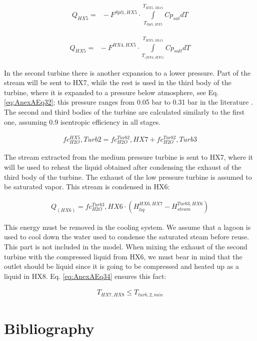 \begin{refsection}[referencesCh2]
\begin{align}
	{{{Q}}_{ {{{HX5}}} }}= \;\; - F^{{Spl1},{{HX5}}}\cdot\int\limits_{{{{T}}_{Spl1,{{HX5}}}}}^{{{{T}}_{{{HX5}},Mix1}}} {C{p_{sat}}dT} \label{eq:AnexAEq30}
\end{align}

\begin{align}
	{{{Q}}_{{{{HX5}}} }} = \;\; - F^{HX4,{{HX5}}}\cdot\int\limits_{{{{T}}_{(HX4,{{HX5)}}}}}^{{{{T}}_{{{HX5}},Mix1}}} {C{p_{salt}}dT} \label{eq:AnexAEq31}
\end{align}

In the second turbine there is another expansion to a lower pressure. Part of the stream will be sent to HX7, while the rest is used in the third body of the turbine,  where it is expanded to a pressure below  atmosphere, see Eq. \ref{eq:AnexAEq32}; this pressure ranges from 0.05 bar to 0.31 bar in the literature \citep{vidal2015optimal}. The second and third bodies of the turbine are calculated similarly to the first one, assuming 0.9 isentropic efficiency in all stages. 

\begin{align}
	{{f}}{{{c}}_{ {H2O} }^{{HX5}},{{Turb2}}} = {{ f}}{{{c}}_{{H2O}}^{{Turb2}},{{HX7}}} + {{f}}{{{c}}_{ {H2O} }^{{Turb2}},{{Turb3}}} \label{eq:AnexAEq32}
\end{align}

The stream extracted from the medium pressure turbine is sent to HX7, where it will be used to reheat the liquid obtained after condensing the exhaust of the third body of the turbine. The exhaust of the low pressure turbine is assumed to be saturated vapor. This stream is condensed in HX6:

\begin{align}
	{{{Q}}_{\left( {{{HX6}}} \right)}} = {{ f}}{{{c}}_{{H2O}}^{{Turb3}},{{HX6}}}\cdot\left( {{{{H}}_{liq}^{HX6,HX7}}{{ - }}{{{H}}_{steam}^{Turb3,HX6}}} \right) \label{eq:AnexAEq33}
\end{align}

This energy must be removed in the cooling system. We assume that a lagoon is used to cool down the water used to condense the saturated steam before reuse. This part is not included in the model. When mixing the exhaust of the second turbine with the compressed liquid from HX6, we must bear in mind that the outlet should be liquid since it is going to be compressed and heated up as a liquid in HX8. Eq. \ref{eq:AnexAEq34} ensures this fact:

\begin{align}
	{{{T}}_{ {{{HX7,HX8}}} }} \le {{{T}}_{{{turb,2,min}}}} \label{eq:AnexAEq34}
\end{align}

\section*{Bibliography}
\printbibliography[heading=none]
\end{refsection}

